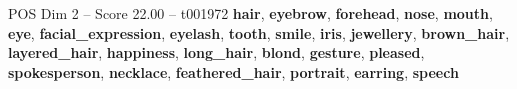 \begin{textsample}{POS Dim 2 – Score 22.00 – t001972}  \label{ex:f2_pos_018}
\textbf{hair}, \textbf{eyebrow}, \textbf{forehead}, \textbf{nose}, \textbf{mouth}, \textbf{eye}, \textbf{facial\_expression}, \textbf{eyelash}, \textbf{tooth}, \textbf{smile}, \textbf{iris}, \textbf{jewellery}, \textbf{brown\_hair}, \textbf{layered\_hair}, \textbf{happiness}, \textbf{long\_hair}, \textbf{blond}, \textbf{gesture}, \textbf{pleased}, \textbf{spokesperson}, \textbf{necklace}, \textbf{feathered\_hair}, \textbf{portrait}, \textbf{earring}, \textbf{speech}

\end{textsample}
